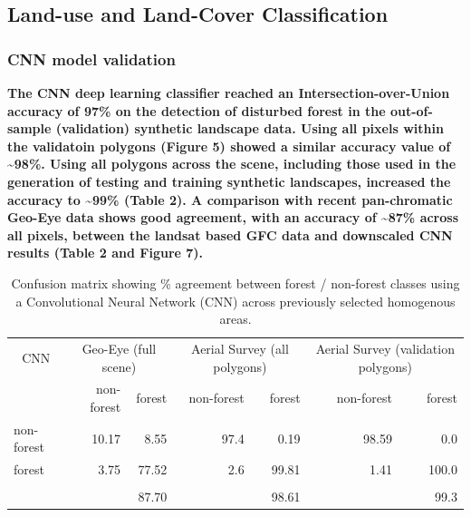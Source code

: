 \documentclass[remote sensing,article,submit,moreauthors,pdftex]{mdpi}
\begin{document}
\hypertarget{land-use-and-land-cover-classification}{%
\subsection{Land-use and Land-Cover
Classification}\label{land-use-and-land-cover-classification}}

\hypertarget{cnn-model-validation}{%
\subsubsection{CNN model validation}\label{cnn-model-validation}}

\textbf{The CNN deep learning classifier reached an
Intersection-over-Union accuracy of 97\% on the detection of disturbed
forest in the out-of-sample (validation) synthetic landscape data. Using
all pixels within the validatoin polygons (Figure 5) showed a similar
accuracy value of \textasciitilde{}98\%. Using all polygons across the
scene, including those used in the generation of testing and training
synthetic landscapes, increased the accuracy to \textasciitilde{}99\%
(Table 2). A comparison with recent pan-chromatic Geo-Eye data shows
good agreement, with an accuracy of \textasciitilde{}87\% across all
pixels, between the landsat based GFC data and downscaled CNN results
(Table 2 and Figure 7).}

\begin{table}[!h]

\caption{\label{tab:unnamed-chunk-7}Confusion matrix showing \% agreement between forest / non-forest classes using a Convolutional Neural Network (CNN) across previously selected homogenous areas.}
\centering
\begin{tabular}[t]{lrrrrrr}
\toprule
\multicolumn{1}{c}{CNN} & \multicolumn{2}{c}{Geo-Eye (full scene)} & \multicolumn{2}{c}{Aerial Survey (all polygons)} & \multicolumn{2}{c}{Aerial Survey (validation polygons)} \\
\cmidrule(l{3pt}r{3pt}){1-1} \cmidrule(l{3pt}r{3pt}){2-3} \cmidrule(l{3pt}r{3pt}){4-5} \cmidrule(l{3pt}r{3pt}){6-7}
  & non-forest & forest & non-forest & forest & non-forest & forest\\
\midrule
non-forest & 10.17 & 8.55 & 97.4 & 0.19 & 98.59 & 0.0\\
forest & 3.75 & 77.52 & 2.6 & 99.81 & 1.41 & 100.0\\
\addlinespace[0.3em]
\multicolumn{7}{l}{\textbf{Accuracy}}\\
\hspace{1em} &  & 87.70 &  & 98.61 &  & 99.3\\
\bottomrule
\end{tabular}
\end{table}
\end{document}
